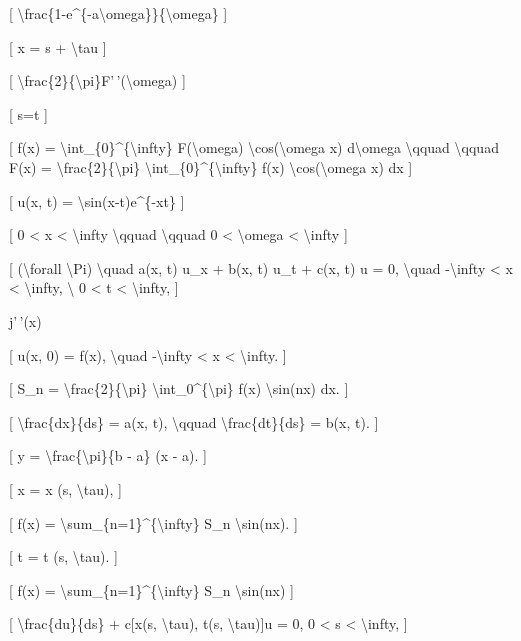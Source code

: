 \documentclass[
]{article}
\begin{document}
{[}
\textbackslash frac\{1-e\^{}\{-a\textbackslash omega\}\}\{\textbackslash omega\}
{]}

{[} x = s + \textbackslash tau {]}

{[}
\textbackslash frac\{2\}\{\textbackslash pi\}F'\,'(\textbackslash omega)
{]}

{[} s=t {]}

{[} f(x) = \textbackslash int\_\{0\}\^{}\{\textbackslash infty\}
F(\textbackslash omega) \textbackslash cos(\textbackslash omega x)
d\textbackslash omega \textbackslash qquad \textbackslash qquad F(x) =
\textbackslash frac\{2\}\{\textbackslash pi\}
\textbackslash int\_\{0\}\^{}\{\textbackslash infty\} f(x)
\textbackslash cos(\textbackslash omega x) dx {]}

{[} u(x, t) = \textbackslash sin(x-t)e\^{}\{-xt\} {]}

{[} 0 \textless{} x \textless{} \textbackslash infty
\textbackslash qquad \textbackslash qquad 0 \textless{}
\textbackslash omega \textless{} \textbackslash infty {]}

{[} (\textbackslash forall \textbackslash Pi) \textbackslash quad a(x,
t) u\_x + b(x, t) u\_t + c(x, t) u = 0, \textbackslash quad
-\textbackslash infty \textless{} x \textless{} \textbackslash infty,
\textbackslash{} 0 \textless{} t \textless{} \textbackslash infty, {]}

j'\,'(x)

{[} u(x, 0) = f(x), \textbackslash quad -\textbackslash infty
\textless{} x \textless{} \textbackslash infty. {]}

{[} S\_n = \textbackslash frac\{2\}\{\textbackslash pi\}
\textbackslash int\_0\^{}\{\textbackslash pi\} f(x)
\textbackslash sin(nx) dx. {]}

{[} \textbackslash frac\{dx\}\{ds\} = a(x, t), \textbackslash qquad
\textbackslash frac\{dt\}\{ds\} = b(x, t). {]}

{[} y = \textbackslash frac\{\textbackslash pi\}\{b - a\} (x - a). {]}

{[} x = x (s, \textbackslash tau), {]}

{[} f(x) = \textbackslash sum\_\{n=1\}\^{}\{\textbackslash infty\} S\_n
\textbackslash sin(nx). {]}

{[} t = t (s, \textbackslash tau). {]}

{[} f(x) = \textbackslash sum\_\{n=1\}\^{}\{\textbackslash infty\} S\_n
\textbackslash sin(nx) {]}

{[} \textbackslash frac\{du\}\{ds\} + c{[}x(s, \textbackslash tau), t(s,
\textbackslash tau){]}u = 0, 0 \textless{} s \textless{}
\textbackslash infty, {]}
\end{document}
